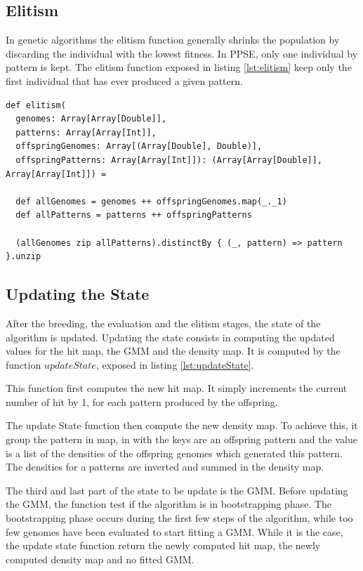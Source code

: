 \documentclass[10pt,letterpaper]{article}
\theoremstyle{definition}
\theoremstyle{remark}
\begin{document}
\subsection*{Elitism}

In genetic algorithms the elitism function generally shrinks the population by discarding the individual with the lowest fitness. In PPSE, only one individual by pattern is kept. The elitism function exposed in listing \ref{lst:elitism} keep only the first individual that has ever produced a given pattern.

\begin{lstlisting}[caption={Elitism function},label={lst:elitism}]
def elitism(
  genomes: Array[Array[Double]],
  patterns: Array[Array[Int]],
  offspringGenomes: Array[(Array[Double], Double)],
  offspringPatterns: Array[Array[Int]]): (Array[Array[Double]], Array[Array[Int]]) =

  def allGenomes = genomes ++ offspringGenomes.map(_._1)
  def allPatterns = patterns ++ offspringPatterns

  (allGenomes zip allPatterns).distinctBy { (_, pattern) => pattern }.unzip
\end{lstlisting}


\subsection*{Updating the State}\label{sec:updateState}

After the breeding, the evaluation and the elitism stages, the state of the algorithm is updated. Updating the state consists in computing the updated values for the hit map, the GMM and the density map. It is computed by the function $updateState$, exposed in listing \ref{lst:updateState}. 

This function first computes the new hit map. It simply increments the current number of hit by 1, for each pattern produced by the offspring.

The update State function then compute the new density map. To achieve this, it group the pattern in map, in with the keys are an offspring pattern and the value is a list of the densities of the offspring genomes which generated this pattern. The densities for a patterns are inverted and summed in the density map.

The third and last part of the state to be update is the GMM. Before updating the GMM, the function test if the algorithm is in bootstrapping phase. The bootstrapping phase occurs during the first few steps of the algorithm, while too few genomes have been evaluated to start fitting a GMM. While it is the case, the update state function return the newly computed hit map, the newly computed density map and no fitted GMM.
\end{document}
